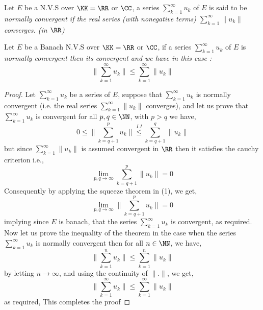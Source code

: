 \begin{definition}[]
Let $E $ be a N.V.S over $\KK = \RR  $ or 
$\CC  $, a series $\sum_{k=1}^{\infty } 
u_{k}$ of $E $ is said to be \it normally
convergent \normalfont if the real series 
(with nonegative terms) 
$\sum_{k=1}^{\infty } \| u_{k} \| $ 
converges. (in $\RR$)
\end{definition}
\begin{theorem}[]
	Let $E $ be a Banach N.V.S 
	over $\KK = \RR  $ or $\CC  $,
	if a series $\sum_{k=1}^{\infty } 
	u_{k}$ of $E $ is \it normally convergent
	\normalfont then its convergent
	and we have in this case : 
	\[
	\| 
	\sum_{k=1}^{\infty } 
	u_{k}\|  \leq 
	\sum_{k=1}^{\infty } 
	\| u_{k} \| 
	\]
\end{theorem}
\begin{proof}
Let $\sum_{k=1}^{\infty } u_{k}$  be
a series of $E $, suppose that 
$\sum_{k=1}^{\infty } u_{k} $ 
is normally convergent (i.e. 
the real series 
$\sum_{k=1}^{\infty}  \| u_{k} \|  $ 
converges), and let us prove
that $\sum_{k=1}^{\infty}  u_{k} $  is convergent
for all $p,q \in \NN $, with $p > q $ we have, 
\begin{equation}
	0 
	\leq  
	\| \sum_{k=q+1}^{p} u_{k} \|  
	\overset{I.I}{ \leq }  
	\sum_{k=q+1}^{q} 
	\| u_{k} \|  
	\label{eq:ins}
\end{equation}
but since $\sum_{k=1}^{\infty} \| u_{k} \|   $ 
is assumed convergent in $\RR  $ then it 
satisfies the cauchy criterion i.e., 
\[
\lim_{p,q \to \infty} 
\sum_{k=q+1}^{p} 
\| u_{k} \|  = 0
\]
Consequently by applying the squeeze theorem in 
(1), we get, 
\[
\lim_{p,q \to \infty} 
\| \sum_{k=q+1}^{p} u_{k} \|  
= 0
\]
implying since $E $ is banach, that 
the series 
$\sum_{k=1}^{\infty}  u_{k} $  is convergent,
as required.\\
Now let us prove the inequality of the theorem
in the case when
the series $\sum_{k=1}^{\infty}  u_{k} $  
is normally convergent then for all 
$n \in \NN $, we have, 
\[
\| \sum_{k=1}^{n} u_{k} \|  \leq 
\sum_{k=1}^{n} 
\| u_{k} \| 
\]
by letting $n \rightarrow  \infty  $, and 
using the continuity of $\| . \|  $, we get, 
\[
	\| \sum_{k=1}^{\infty}  u_{k} \|  
	\leq \sum_{k=1}^{\infty}  \| u_{k} \| 
\]
as required, This completes the proof
\end{proof}

